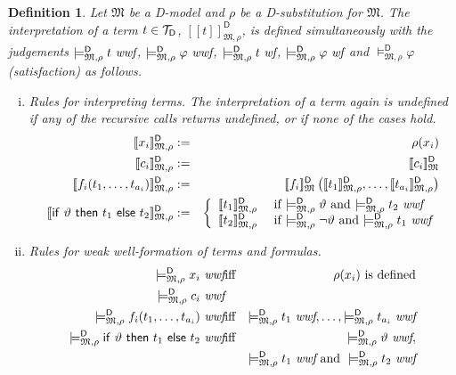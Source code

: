 \documentclass{article}
\newtheorem{definition}{Definition}[section]
\newcommand{\D}{\textsf D}
\newcommand{\ifthelse}[3]{\ensuremath{\mathsf{if}\ {#1}\ \mathsf{then}\ {#2}\ \mathsf{else}\ {#3}}}
\newcommand{\wf}{\ \mbox{\em wf}}
\newcommand{\wwf}{\ \mbox{\em wwf}}
\newcommand{\terms}[1]{\ensuremath{{\cal T}_{\mathsf{#1}}}}
\newcommand{\intm}[3]{\ensuremath{[\![{#3}]\!]^{\mathsf{#1}}_{\mathfrak{#2}}}}
\newcommand{\ints}[4]{\ensuremath{[\![{#4}]\!]^{\mathsf{#1}}_{\mathfrak{#2},{#3}}}}
\newcommand{\mymodelss}[3]{\ensuremath{\models_{\mathfrak{#2},{#3}}^{\mathsf{#1}}}}
\begin{document}
\begin{definition}\label{defn:Dinterpretation}\label{defn:Dsatisfaction}
Let $\mathfrak M$ be a {\D}-model and $\rho$ be a {\D}-substitution for
$\mathfrak M$.
The interpretation of a term $t\in\terms D$,
{\ints{D}M\rho t}, is defined simultaneously with the judgements 
$\mymodelss{D}M\rho t\wwf$, $\mymodelss{D}M\rho\varphi\wwf$,
$\mymodelss{D}M\rho t\wf$, $\mymodelss{D}M\rho\varphi\wf$ and
$\mymodelss{D}M\rho\varphi$ (satisfaction) as follows.
\begin{enumerate}[(i)]
\item Rules for interpreting terms.  The interpretation of a term again is
undefined if any of the recursive calls returns undefined, or if none of the
cases hold.
\begin{eqnarray*}
\ints{D}M\rho{x_i} & := & \rho(x_i) \\
\ints{D}M\rho{c_i} & := & \intm{D}M{c_i} \\
\ints{D}M\rho{f_i(t_1,\ldots,t_{a_i})} & := &
 \intm{D}M{f_i}\left(\ints{D}M\rho{t_1},\ldots,\ints{D}M\rho{t_{a_i}}\right) \\
\ints{D}M\rho{\ifthelse\vartheta{t_1}{t_2}} & := & \left\{\begin{array}{ll}
   \ints{D}M\rho{t_1} & \mbox{ if $\mymodelss{D}M\rho\vartheta$ and $\mymodelss{D}M\rho t_2\wwf$} \\
   \ints{D}M\rho{t_2} & \mbox{ if $\mymodelss{D}M\rho\neg\vartheta$ and $\mymodelss{D}M\rho t_1\wwf$}
\end{array}\right. \\
\end{eqnarray*}
\item Rules for weak well-formation of terms and formulas.
\begin{eqnarray*}
\mymodelss{D}M\rho{x_i}\wwf & \mbox{iff} & \rho(x_i)\mbox{ is defined} \\
\mymodelss{D}M\rho{c_i}\wwf \\
\mymodelss{D}M\rho{f_i(t_1,\ldots,t_{a_i})}\wwf & \mbox{iff} &
  \mymodelss{D}M\rho{t_1}\wwf,\ldots,\mymodelss{D}M\rho{t_{a_i}}\wwf \\
\mymodelss{D}M\rho{\ifthelse\vartheta{t_1}{t_2}}\wwf & \mbox{iff} & 
  \mymodelss{D}M\rho\vartheta\wwf, \\
  & & \mymodelss{D}M\rho{t_1}\wwf\mbox{ and }\mymodelss{D}M\rho{t_2}\wwf\\
 \\

\end{eqnarray*}
\end{enumerate}
\end{definition}
\end{document}
